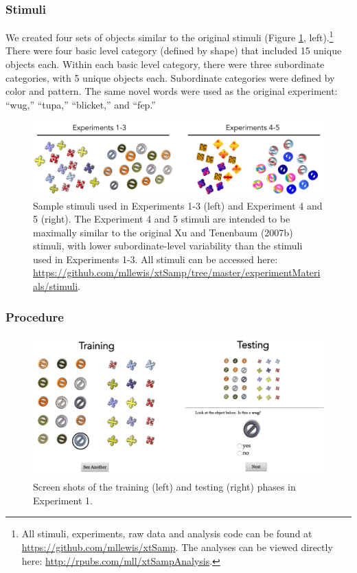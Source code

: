 \documentclass[man]{apa2}
\begin{document}
\subsubsection{Stimuli}
We created four sets of objects similar to the original stimuli (Figure \ref{fig:stims}, left).\footnote{All stimuli, experiments, raw data and analysis code can be found at \url{https://github.com/mllewis/xtSamp}. The analyses can be viewed directly here: \url{http://rpubs.com/mll/xtSampAnalysis}.} There were four basic level category (defined by shape) that included 15 unique objects each. Within each basic level category, there were three subordinate categories, with 5 unique objects each. Subordinate categories were defined by color and pattern. The same novel words were used as the original experiment: ``wug,'' ``tupa,'' ``blicket,'' and ``fep.''
\begin{figure}[t]
 \begin{center} 
 \includegraphics[width=5in]{figures/stims.png} 
 \caption{ \label{fig:stims} Sample stimuli used in Experiments 1-3 (left) and Experiment 4 and 5 (right). The Experiment 4 and 5 stimuli are intended to be maximally similar to the original Xu and Tenenbaum (2007b) stimuli, with lower subordinate-level variability than the stimuli used in Experiments 1-3. All stimuli can be accessed here: \url{https://github.com/mllewis/xtSamp/tree/master/experimentMaterials/stimuli}. } 
 \end{center} 
\end{figure}	
 
\subsubsection{Procedure}
 \begin{figure} [t]
 \begin{center} 
 \includegraphics[width=5.5in]{figures/screen.png} 
 \caption{\label{fig:screen} Screen shots of the training (left) and testing (right) phases in Experiment 1. } 
 \end{center} 
\end{figure}
\end{document}
